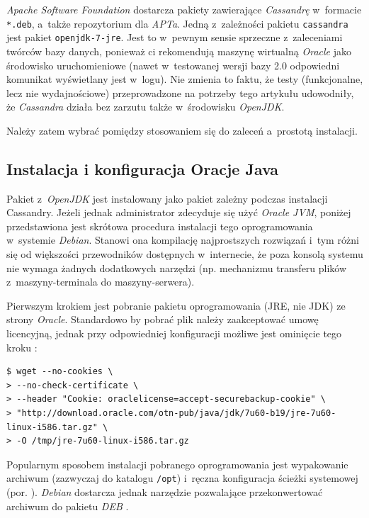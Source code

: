 \documentclass{article} %
\begin{document}
\emph{Apache Software Foundation} dostarcza pakiety zawierające \emph{Cassandrę} w~formacie \texttt{*.deb}, a~także repozytorium dla \emph{APTa}.
Jedną z~zależności pakietu \texttt{cassandra} jest pakiet \texttt{openjdk-7-jre}.
Jest to w~pewnym sensie sprzeczne z~zaleceniami twórców bazy danych, ponieważ ci rekomendują maszynę wirtualną \emph{Oracle} jako środowisko uruchomieniowe (nawet w~testowanej wersji bazy 2.0 odpowiedni komunikat wyświetlany jest w~logu).
Nie zmienia to faktu, że testy (funkcjonalne, lecz nie wydajnościowe) przeprowadzone na potrzeby tego artykułu udowodniły, że \emph{Cassandra} działa bez zarzutu także w~środowisku \emph{OpenJDK}. 

Należy zatem wybrać pomiędzy stosowaniem się do zaleceń a~prostotą instalacji.

\subsection{Instalacja i konfiguracja Oracje Java}\label{subsec:install_oracle}

Pakiet z~\emph{OpenJDK} jest instalowany jako pakiet zależny podczas instalacji Cassandry.
Jeżeli jednak administrator zdecyduje się użyć \emph{Oracle JVM}, poniżej przedstawiona jest skrótowa procedura instalacji tego oprogramowania w~systemie \emph{Debian}.
Stanowi ona kompilację najprostszych rozwiązań i~tym różni się od większości przewodników dostępnych w~internecie, że poza konsolą systemu nie wymaga żadnych dodatkowych narzędzi (np. mechanizmu transferu plików z~maszyny-terminala do maszyny-serwera).

Pierwszym krokiem jest pobranie pakietu oprogramowania (JRE, nie JDK) ze strony \emph{Oracle}.
Standardowo by pobrać plik należy zaakceptować umowę licencyjną, jednak przy odpowiedniej konfiguracji możliwe jest ominięcie tego kroku \cite{downloading_oracle_java}:

\begin{lstlisting}[style=bash, caption={pobieranie \emph{Oracle JRE}}]
$ wget --no-cookies \
> --no-check-certificate \
> --header "Cookie: oraclelicense=accept-securebackup-cookie" \
> "http://download.oracle.com/otn-pub/java/jdk/7u60-b19/jre-7u60-linux-i586.tar.gz" \
> -O /tmp/jre-7u60-linux-i586.tar.gz
\end{lstlisting}

Popularnym sposobem instalacji pobranego oprogramowania jest wypakowanie archiwum (zazwyczaj do katalogu \texttt{/opt}) i~ręczna konfiguracja ścieżki systemowej (por. \cite{downloading_oracle_java}).
\emph{Debian} dostarcza jednak narzędzie pozwalające przekonwertować archiwum do pakietu \emph{DEB} \cite{installing_oracle_java_on_debian}.
\end{document}
